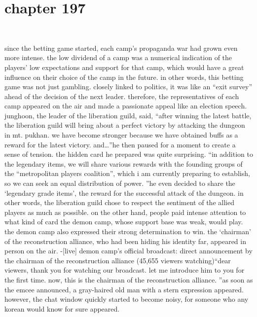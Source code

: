 \section{chapter 197}

                             




since the betting game started, each camp’s propaganda war had grown even more intense.
the low dividend of a camp was a numerical indication of the players’ low expectations and support for that camp, which would have a great influence on their choice of the camp in the future.
in other words, this betting game was not just gambling.
 closely linked to politics, it was like an “exit survey” ahead of the decision of the next leader.
therefore, the representatives of each camp appeared on the air and made a passionate appeal like an election speech.
junghoon, the leader of the liberation guild, said, “after winning the latest battle, the liberation guild will bring about a perfect victory by attacking the dungeon in mt.
 pukhan.
 we have become stronger because we have obtained buffs as a reward for the latest victory.
 and…”he then paused for a moment to create a sense of tension.
the hidden card he prepared was quite surprising.
“in addition to the legendary items, we will share various rewards with the founding groups of the “metropolitan players coalition”, which i am currently preparing to establish, so we can seek an equal distribution of power.
”he even decided to share the ‘legendary grade items’, the reward for the successful attack of the dungeon.
 in other words, the liberation guild chose to respect the sentiment of the allied players as much as possible.
on the other hand, people paid intense attention to what kind of card the demon camp, whose support base was weak, would play.
the demon camp also expressed their strong determination to win.
 the ‘chairman’ of the reconstruction alliance, who had been hiding his identity far, appeared in person on the air.
-[live] demon camp’s official broadcast: direct announcement by the chairman of the reconstruction alliance (45,655 viewers watching)“dear viewers, thank you for watching our broadcast.
 let me introduce him to you for the first time.
 now, this is the chairman of the reconstruction alliance.
”as soon as the emcee announced, a gray-haired old man with a stern expression appeared.
however, the chat window quickly started to become noisy, for someone who any korean would know for sure appeared.

